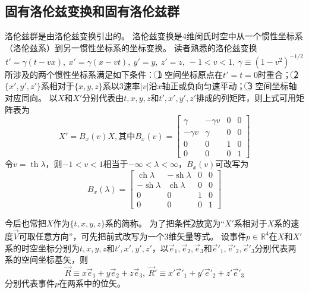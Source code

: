 \subsection{固有洛伦兹变换和固有洛伦兹群}

洛伦兹群是由洛伦兹变换引出的。
洛伦兹变换是$4$维闵氏时空中从一个惯性坐标系（洛伦兹系）到另一惯性坐标系的坐标变换。
读者熟悉的洛伦兹变换
$$t' = \gamma(t - vx), ~ x' = \gamma(x - vt), ~ y' = y, ~ z' = z, ~ -1 < v < 1, ~ \gamma \equiv (1 - v^2)^{-1 / 2}$$
所涉及的两个惯性坐标系满足如下条件：
\textcircled{1} 空间坐标原点在$t' = t = 0$时重合；
\textcircled{2} $\{x', y', z'\}$系相对于$\{x, y, z\}$系以$3$速率$|v|$沿$x$轴正或负向匀速平动；
\textcircled{3} 空间坐标轴对应同向。
以$X$和$X'$分别代表由$t, x, y, z$和$t', x', y', z'$排成的列矩阵，则上式可用矩阵表为
$$X' = B_x(v)X, \text{其中} B_x(v) = \begin{bmatrix}
    \gamma & -\gamma v & 0 & 0 \\
    -\gamma v & \gamma & 0 & 0 \\
    0 & 0 & 1 & 0 \\
    0 & 0 & 0 & 1
\end{bmatrix}$$
令$v = \operatorname{th}\lambda$，则$-1 < v < 1$相当于$-\infty < \lambda < \infty$，$B_x(v)$可改写为
$$B_x(\lambda) = \begin{bmatrix}
    \operatorname{ch}\lambda & -\operatorname{sh}\lambda & 0 & 0 \\
    -\operatorname{sh}\lambda & \operatorname{ch}\lambda & 0 & 0 \\
    0 & 0 & 1 & 0 \\
    0 & 0 & 0 & 1
\end{bmatrix}$$

今后也常把$X$作为$\{t, x, y, z\}$系的简称。
为了把条件\textcircled{2}放宽为``$X'$系相对于$X$系的速度$\vec V$可取任意方向''，可先把前式改写为一个$3$维矢量等式。
设事件$p \in \mathbb{R}^4$在$X$和$X'$系的时空坐标分别为$t, x, y, z$和$t', x', y', z'$，以$\vec e_1, \vec e_2, \vec e_3$和$\vec e'_1, \vec e'_2, \vec e'_3$分别代表两系的空间坐标基矢，则
$$\vec R \equiv x\vec e_1 + y\vec e_2 + z\vec e_3, ~ \vec R' \equiv x'\vec e'_1 + y'\vec e'_2 + z'\vec e'_3$$
分别代表事件$p$在两系中的位矢。

\fi
